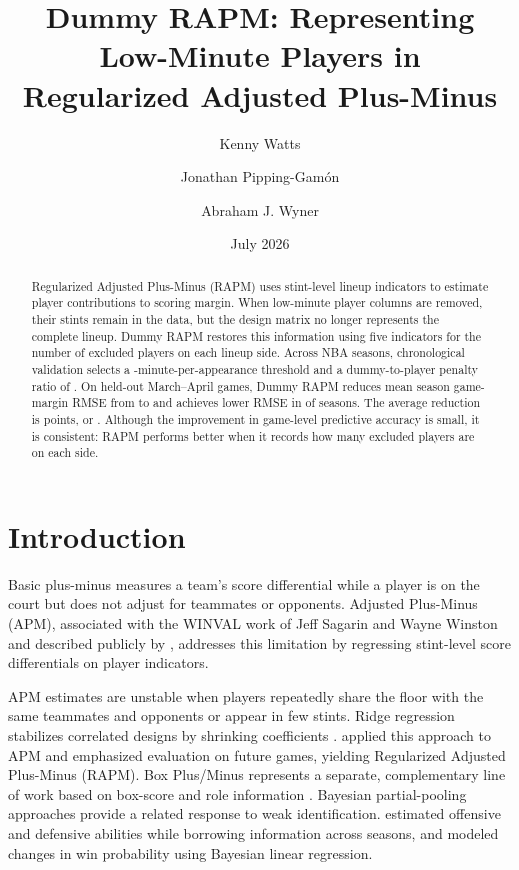 \documentclass[12pt]{article}
\title{Dummy RAPM: Representing Low-Minute Players in\\
Regularized Adjusted Plus-Minus}
\author{Kenny Watts}
\author{Jonathan Pipping-Gam\'on}
\author{Abraham J. Wyner}
\affil{\small The Wharton School, University of Pennsylvania}
\date{July 2026}
\begin{document}
\maketitle

\begin{abstract}
Regularized Adjusted Plus-Minus (RAPM) uses stint-level lineup indicators to
estimate player contributions to scoring margin. When low-minute player
columns are removed, their stints remain in the data, but the design matrix no
longer represents the complete lineup. Dummy RAPM restores this information
using five indicators for the number of excluded players on each lineup side.
Across \NumberSeasons{} NBA seasons, chronological validation selects a
\SelectedThreshold-minute-per-appearance threshold and a dummy-to-player
penalty ratio of \SelectedPenaltyRatio. On held-out March--April games, Dummy
RAPM reduces mean season game-margin RMSE from \MeanNoDummyRMSE{} to
\MeanDummyRMSE{} and achieves lower RMSE in \RMSEWins{} of \NumberSeasons{}
seasons. The average reduction is \MeanRMSEGain{} points, or
\RelativeRMSEGain{}. Although the improvement in game-level predictive
accuracy is small, it is consistent: RAPM performs better when it records how
many excluded players are on each side.
\end{abstract}

\section{Introduction}

Basic plus-minus measures a team's score differential while a player is on the
court but does not adjust for teammates or opponents. Adjusted Plus-Minus
(APM), associated with the WINVAL work of Jeff Sagarin and Wayne Winston and
described publicly by \citet{Rosenbaum2004}, addresses this limitation by
regressing stint-level score differentials on player indicators.

APM estimates are unstable when players repeatedly share the floor with the
same teammates and opponents or appear in few stints. Ridge regression
stabilizes correlated designs by shrinking coefficients
\citep{HoerlKennard1970}. \citet{Sill2010} applied this approach to APM and
emphasized evaluation on future games, yielding Regularized Adjusted
Plus-Minus (RAPM). Box Plus/Minus represents a separate, complementary line of
work based on box-score and role information \citep{Myers2020}. Bayesian
partial-pooling approaches provide a related response to weak identification.
\citet{FearnheadTaylor2011} estimated offensive and defensive abilities while
borrowing information across seasons, and \citet{DeshpandeJensen2016} modeled
changes in win probability using Bayesian linear regression.
\end{document}
